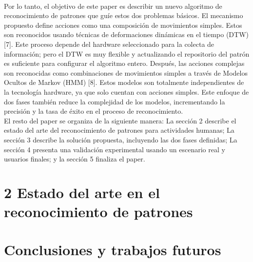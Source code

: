 \documentclass[10pt]{article}
\begin{document}
\\
Por lo tanto, el objetivo de este paper es describir un nuevo algoritmo de reconocimiento de patrones que guíe estos dos problemas básicos. El mecanismo propuesto define acciones como una composición de movimientos simples. Estos son reconocidos usando técnicas de deformaciones dinámicas en el tiempo (DTW) [7]. Este proceso depende del hardware seleccionado para la colecta de información; pero el DTW  es muy flexible y actualizando el repositorio del patrón es suficiente para configurar el algoritmo entero. Después, las acciones complejas son reconocidas como combinaciones de movimientos simples a través de Modelos Ocultos de Markov (HMM) [8]. Estos modelos son totalmente independientes de la tecnología hardware, ya que solo cuentan con acciones simples. Este enfoque de dos fases también reduce la complejidad de los modelos, incrementando la precisión y la tasa de éxito en el proceso de reconocimiento.
\\
El resto del paper se organiza de la siguiente manera: La sección 2 describe el estado del arte del reconocimiento de patrones para actividades humanas; La sección 3 describe la solución propuesta, incluyendo las dos fases definidas; La sección 4 presenta una validación experimental usando un escenario real y usuarios finales; y la sección 5 finaliza el paper.

\section{2 Estado del arte en el reconocimiento de patrones}



\section{Conclusiones y trabajos futuros}
\end{document}
